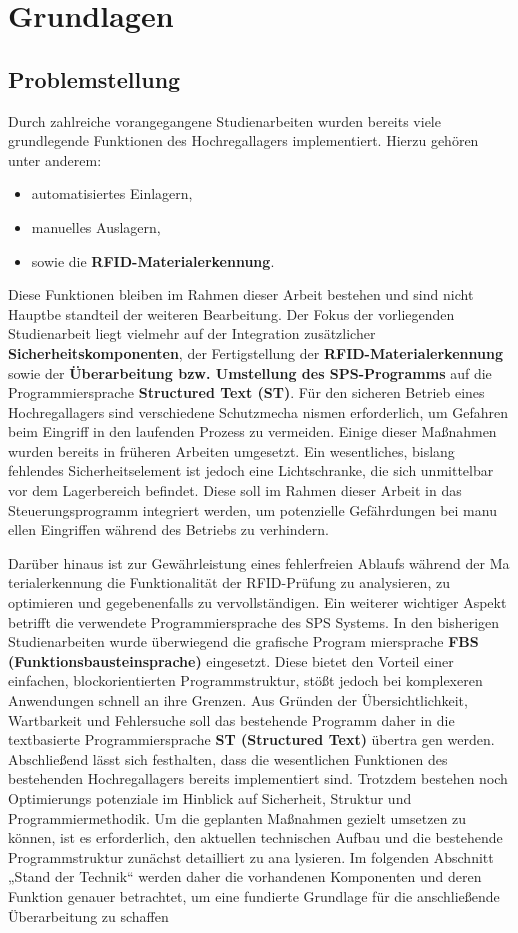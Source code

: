 \section{Grundlagen}
\subsection{Problemstellung}
Durch zahlreiche vorangegangene Studienarbeiten wurden bereits viele grundlegende
Funktionen des Hochregallagers implementiert.
Hierzu gehören unter anderem:

\begin{itemize}
    \item automatisiertes Einlagern,
    \item manuelles Auslagern,
    \item sowie die \textbf{RFID-Materialerkennung}.
\end{itemize}

Diese Funktionen bleiben im Rahmen dieser Arbeit bestehen und sind nicht Hauptbe
standteil der weiteren Bearbeitung.
Der Fokus der vorliegenden Studienarbeit liegt vielmehr auf der Integration zusätzlicher
\textbf{Sicherheitskomponenten}, der Fertigstellung der \textbf{RFID-Materialerkennung} sowie der
\textbf{Überarbeitung bzw. Umstellung des SPS-Programms} auf die Programmiersprache
\textbf{Structured Text (ST)}.
Für den sicheren Betrieb eines Hochregallagers sind verschiedene Schutzmecha
nismen erforderlich, um Gefahren beim Eingriff in den laufenden Prozess zu vermeiden.
Einige dieser Maßnahmen wurden bereits in früheren Arbeiten umgesetzt.
Ein wesentliches, bislang fehlendes Sicherheitselement ist jedoch eine Lichtschranke,
die sich unmittelbar vor dem Lagerbereich befindet. Diese soll im Rahmen dieser Arbeit
in das Steuerungsprogramm integriert werden, um potenzielle Gefährdungen bei manu
ellen Eingriffen während des Betriebs zu verhindern.


Darüber hinaus ist zur Gewährleistung eines fehlerfreien Ablaufs während der Ma
terialerkennung die Funktionalität der RFID-Prüfung zu analysieren, zu optimieren und
gegebenenfalls zu vervollständigen.
Ein weiterer wichtiger Aspekt betrifft die verwendete Programmiersprache des SPS
Systems. In den bisherigen Studienarbeiten wurde überwiegend die grafische Program
miersprache \textbf{FBS (Funktionsbausteinsprache)} eingesetzt. Diese bietet den Vorteil
einer einfachen, blockorientierten Programmstruktur, stößt jedoch bei komplexeren
Anwendungen schnell an ihre Grenzen.
Aus Gründen der Übersichtlichkeit, Wartbarkeit und Fehlersuche soll das bestehende
Programm daher in die textbasierte Programmiersprache \textbf{ST (Structured Text)} übertra
gen werden.
Abschließend lässt sich festhalten, dass die wesentlichen Funktionen des bestehenden
Hochregallagers bereits implementiert sind. Trotzdem bestehen noch Optimierungs
potenziale im Hinblick auf Sicherheit, Struktur und Programmiermethodik. Um die
geplanten Maßnahmen gezielt umsetzen zu können, ist es erforderlich, den aktuellen
technischen Aufbau und die bestehende Programmstruktur zunächst detailliert zu ana
lysieren. Im folgenden Abschnitt „Stand der Technik“ werden daher die vorhandenen
Komponenten und deren Funktion genauer betrachtet, um eine fundierte Grundlage für
die anschließende Überarbeitung zu schaffen

